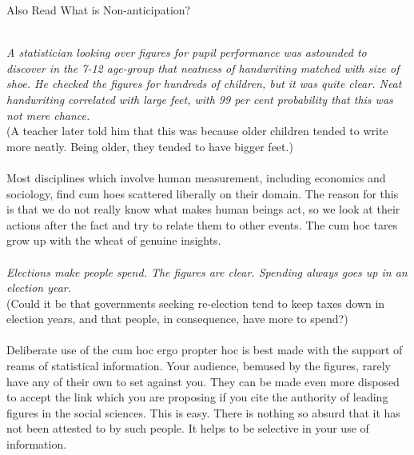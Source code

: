 \documentclass[a4paper,12pt,single,pdftex]{scrartcl}
\begin{document}
{    
      

      
        Also Read  What is Non-anticipation?
      
    
    
       
    \\

    
      {\em A statistician looking over figures for pupil performance was astounded to discover in the 7-12 age-group that neatness of handwriting matched with size of shoe. He checked the figures for hundreds of children, but it was quite clear. Neat handwriting correlated with large feet, with 99 per cent probability that this was not mere chance.}
    \\

    
      (A teacher later told him that this was because older children tended to write more neatly. Being older, they tended to have bigger feet.)
    \\

    
       
    \\

    
      Most disciplines which involve human measurement, including economics and sociology, find cum hoes scattered liberally on their domain. The reason for this is that we do not really know what makes human beings act, so we look at their actions after the fact and try to relate them to other events. The cum hoc tares grow up with the wheat of genuine insights.
    \\

    
       
    \\

    
      {\em Elections make people spend. The figures are clear. Spending always goes up in an election year.}
    \\

    
      (Could it be that governments seeking re-election tend to keep taxes down in election years, and that people, in consequence, have more to spend?)
    \\

    
       
    \\

    
      Deliberate use of the cum hoc ergo propter hoc is best made with the support of reams of statistical information. Your audience, bemused by the figures, rarely have any of their own to set against you. They can be made even more disposed to accept the link which you are proposing if you cite the authority of leading figures in the social sciences. This is easy. There is nothing so absurd that it has not been attested to by such people. It helps to be selective in your use of information.
    \\

}
\end{document}
